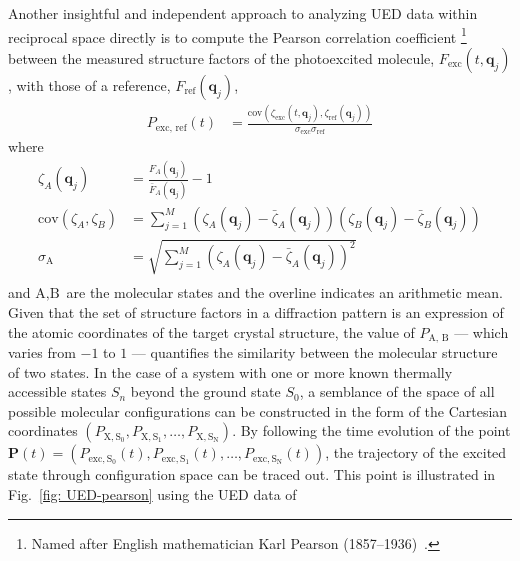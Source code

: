 Another insightful and independent approach to analyzing UED data within reciprocal space directly
is to compute the Pearson correlation coefficient%
\footnote{Named after English mathematician Karl Pearson (1857--1936)~\cite{KarlPearson}.}
between the measured structure factors of the photoexcited molecule, $F_\text{exc}(t, \boldsymbol{q}_j)$,
with those of a reference, $F_\text{ref}(\boldsymbol{q}_j)$,
%
\begin{equation}
  \begin{aligned}
    P_\text{exc, ref}(t)
      & = \frac{\text{cov}(\zeta_\text{exc}(t, \boldsymbol{q}_j), \zeta_\text{ref}(\boldsymbol{q}_j))}{\sigma_\text{exc} \sigma_\text{ref}}
  \end{aligned}
  \label{eq: UED-Pearson}
\end{equation}
%
where
%
\begin{equation}
  \begin{aligned}
    \zeta_A(\boldsymbol{q}_j) & = \frac{F_A(\boldsymbol{q}_j)}{\bar{F}_A(\boldsymbol{q}_j)} - 1\\
    \text{cov}(\zeta_A, \zeta_B)
      & = \sum_{j = 1}^M \left( \zeta_A(\boldsymbol{q}_j) - \bar{\zeta}_A(\boldsymbol{q}_j) \right)
        \left( \zeta_B(\boldsymbol{q}_j) - \bar{\zeta}_B(\boldsymbol{q}_j) \right) \\
    \sigma_\text{A}
      & = \sqrt{\sum_{j = 1}^M \left(\zeta_A(\boldsymbol{q}_j) - \bar{\zeta}_A(\boldsymbol{q}_j) \right)^2} \\
  \end{aligned}
\end{equation}
%
and $\text{A}, \text{B}$ are the molecular states and
the overline indicates an arithmetic mean.
Given that the set of structure factors in a diffraction pattern is an expression of
the atomic coordinates of the target crystal structure,
the value of $P_\text{A, B}$ --- which varies from $-1$ to $1$ ---
quantifies the similarity between the molecular structure of two states.
In the case of a system with one or more known thermally accessible states $S_n$ beyond
the ground state $S_0$, a semblance of the space of all possible molecular configurations
can be constructed in the form of the Cartesian coordinates
$\left( P_\mathrm{X, S_0}, P_\mathrm{X, S_1}, \ldots, P_\mathrm{X, S_N} \right)$.
By following the time evolution of the point
$\boldsymbol{P}(t) = \left( P_\mathrm{exc, S_0}(t), P_\mathrm{exc, S_1}(t), \ldots,  P_\mathrm{exc, S_N}(t) \right)$,
the trajectory of the excited state through configuration space can be traced out.
This point is illustrated in Fig.~\ref{fig: UED-pearson} using the UED data of
